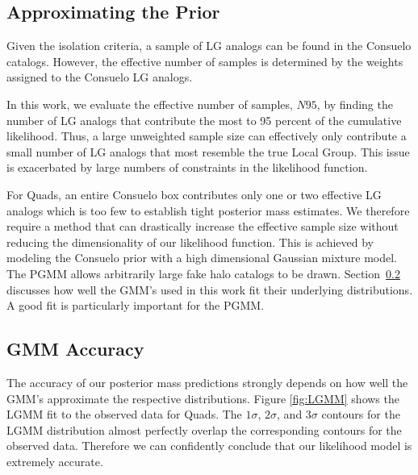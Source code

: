 \documentclass[iop,apj,twocolappendix,numberedappendix]{emulateapj}
\newcommand{\consuelo}{{\sc Consuelo }}
\def\Sref#1{Section~\ref{#1}}
\begin{document}
\subsection{Approximating the Prior}
\label{sec:gmm_prior}

Given the isolation criteria, a sample of LG analogs can be found in the \consuelo catalogs.  However, the effective number of samples is determined by the weights assigned to the \consuelo LG analogs. 

In this work, we evaluate the effective number of samples, $N95$, by finding the number of LG analogs that contribute the most to 95 percent of the cumulative likelihood. 
Thus, a large unweighted sample size can effectively only contribute a small number of LG analogs that most resemble the true Local Group. 
This issue is exacerbated by large numbers of constraints in the likelihood function. 

For Quads, an entire \consuelo box contributes only one or two effective LG analogs which is too few to establish tight posterior mass estimates.  
We therefore require a method that can drastically increase the effective sample size without reducing the dimensionality of our likelihood function. 
This is achieved by modeling the \consuelo prior with a high dimensional Gaussian mixture model. The PGMM allows arbitrarily large fake halo catalogs to be drawn. 
\Sref{sec:gmm_gof} discusses how well the GMM's used in this work fit their underlying distributions. A good fit is particularly important for the PGMM.

\subsection{GMM Accuracy}
\label{sec:gmm_gof}

The accuracy of our posterior mass predictions strongly depends on how well the GMM's approximate the respective distributions. Figure \ref{fig:LGMM} shows the LGMM fit to the observed data for Quads. 
The $1\sigma$, $2\sigma$, and $3\sigma$ contours for the LGMM distribution almost perfectly overlap the corresponding contours for the observed data.  Therefore we can confidently conclude that our likelihood model is extremely accurate. 
\end{document}
